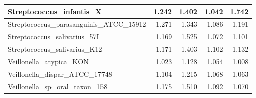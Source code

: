 \documentclass[12pt,a4paper]{article}
\begin{document}
\begin{table}[ht]
\begin{center}
\begin{tabular}{|l*{4}{|r}|}
Streptococcus\_infantis\_X & 1.242 & 1.402 & 1.042 & 1.742 \\ \hline
Streptococcus\_parasanguinis\_ATCC\_15912 & 1.271 & 1.343 & 1.086 & 1.191 \\ \hline
Streptococcus\_salivarius\_57I & 1.169 & 1.525 & 1.072 & 1.101 \\ \hline
Streptococcus\_salivarius\_K12 & 1.171 & 1.403 & 1.102 & 1.132 \\ \hline
Veillonella\_atypica\_KON & 1.023 & 1.128 & 1.054 & 1.008 \\ \hline
Veillonella\_dispar\_ATCC\_17748 & 1.104 & 1.215 & 1.068 & 1.063 \\ \hline
Veillonella\_sp\_oral\_taxon\_158 & 1.175 & 1.510 & 1.092 & 1.070 \\ \hline
\end{tabular}
\end{center}
\end{table}
\end{document}
